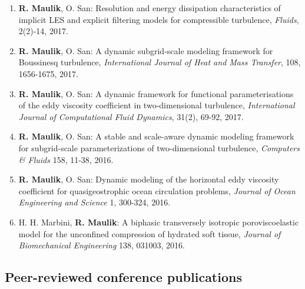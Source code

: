\documentclass[letterpaper]{article}
\begin{document}
\begin{enumerate}
\item \textbf{R. Maulik}, O. San: Resolution and energy dissipation characteristics of implicit LES and explicit filtering models for compressible turbulence, {\it Fluids}, 2(2)-14, 2017. 

\item \textbf{R. Maulik}, O. San: A dynamic subgrid-scale modeling framework for Boussinesq turbulence, {\it International Journal of Heat and Mass Transfer}, 108, 1656-1675, 2017. 

\item \textbf{R. Maulik}, O. San: A dynamic framework for functional parameterisations of the eddy viscosity coefficient in two-dimensional turbulence, {\it International Journal of Computational Fluid Dynamics}, 31(2), 69-92, 2017. 

\item \textbf{R. Maulik}, O. San: A stable and scale-aware dynamic modeling framework for subgrid-scale parameterizations of two-dimensional turbulence, {\it Computers \& Fluids} 158, 11-38, 2016. 

\item \textbf{R. Maulik}, O. San: Dynamic modeling of the horizontal eddy viscosity coefficient for quasigeostrophic ocean circulation problems, {\it Journal of Ocean Engineering and Science} 1, 300-324, 2016.

\item H. H. Marbini, \textbf{R. Maulik}: A biphasic transversely isotropic poroviscoelastic model for the unconfined compression of hydrated soft tissue, {\it Journal of Biomechanical Engineering} 138, 031003, 2016.

\end{enumerate}

\subsection*{Peer-reviewed conference publications}
\end{document}
